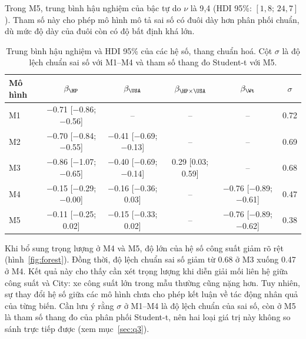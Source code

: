 \documentclass[12pt,a4paper]{report}
\begin{document}
Trong M5, trung bình hậu nghiệm của bậc tự do $\nu$ là 9{,}4 (HDI 95\%:
$[1{,}8;\, 24{,}7]$). Tham số này cho phép mô hình mô tả sai số có đuôi dày
hơn phân phối chuẩn, dù mức độ dày của đuôi còn có độ bất định khá lớn.

\begin{table}[tp]
  \centering
  \small
  \caption{Trung bình hậu nghiệm và HDI 95\% của các hệ số, thang chuẩn hoá. Cột
    $\sigma$ là độ lệch chuẩn sai số với M1--M4 và tham số thang đo Student-t với
    M5.}
  \label{tab:posterior}
  \begin{tabular}{lccccc}
    \toprule
    Mô hình & $\beta_{\HP}$ & $\beta_{\USA}$ & $\beta_{\HP \times \USA}$ & $\beta_{\Wt}$ & $\sigma$ \\
    \midrule
    M1 & \num{-0.71} [\num{-0.86}; \num{-0.56}] & -- & -- & -- & \num{0.72} \\
    M2 & \num{-0.70} [\num{-0.84}; \num{-0.55}] & \num{-0.41} [\num{-0.69}; \num{-0.13}] & -- & -- & \num{0.69} \\
    M3 & \num{-0.86} [\num{-1.07}; \num{-0.65}] & \num{-0.40} [\num{-0.69}; \num{-0.14}] & \num{0.29} [\num{0.03}; \num{0.59}] & -- & \num{0.68} \\
    M4 & \num{-0.15} [\num{-0.29}; \num{-0.00}] & \num{-0.16} [\num{-0.36}; \num{0.03}] & -- & \num{-0.76} [\num{-0.89}; \num{-0.61}] & \num{0.47} \\
    M5 & \num{-0.11} [\num{-0.25}; \num{0.02}] & \num{-0.15} [\num{-0.33}; \num{0.02}] & -- & \num{-0.76} [\num{-0.89}; \num{-0.62}] & \num{0.38} \\
    \bottomrule
  \end{tabular}
\end{table}

Khi bổ sung trọng lượng ở M4 và M5, độ lớn của hệ số công suất giảm rõ rệt
(hình~\ref{fig:forest}). Đồng thời, độ lệch chuẩn sai số giảm từ \num{0.68} ở
M3 xuống \num{0.47} ở M4. Kết quả này cho thấy cần xét trọng lượng khi diễn
giải mối liên hệ giữa công suất và City: xe công suất lớn trong mẫu thường cũng
nặng hơn. Tuy nhiên, sự thay đổi hệ số giữa các mô hình chưa cho phép kết luận
về tác động nhân quả của từng biến. Cần lưu ý rằng $\sigma$ ở M1--M4 là độ lệch chuẩn của
sai số, còn ở M5 là tham số thang đo của phân phối Student-t, nên hai loại giá
trị này không so sánh trực tiếp được (xem mục~\ref{sec:q3}).


\end{document}
